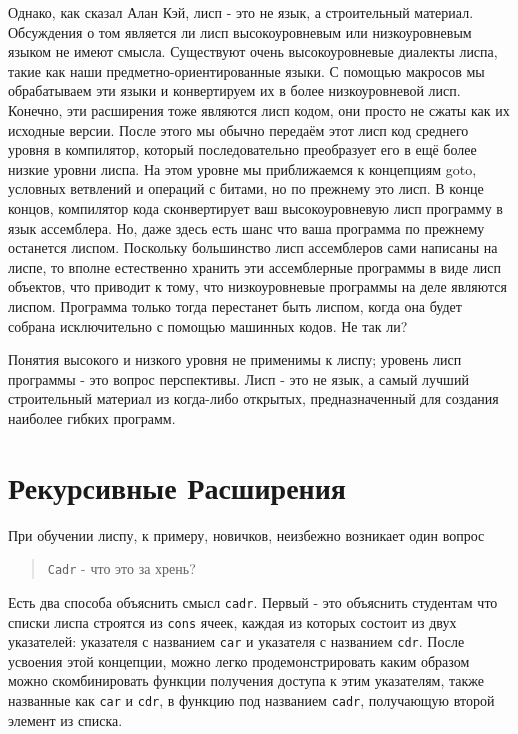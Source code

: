 Однако, как сказал Алан Кэй, лисп - это не язык, а строительный материал. Обсуждения о том является ли лисп высокоуровневым или низкоуровневым языком не имеют смысла. Существуют очень высокоуровневые диалекты лиспа, такие как наши предметно-ориентированные языки. С помощью макросов мы обрабатываем эти языки и конвертируем их в более низкоуровневой лисп. Конечно, эти расширения тоже являются лисп кодом, они просто не сжаты как их исходные версии. После этого мы обычно передаём этот лисп код среднего уровня в компилятор, который последовательно преобразует его в ещё более низкие уровни лиспа. На этом уровне мы приближаемся к концепциям goto, условных ветвлений и операций с битами, но по прежнему это лисп. В конце концов, компилятор кода сконвертирует ваш высокоуровневую лисп программу в язык ассемблера. Но, даже здесь есть шанс что ваша программа по прежнему останется лиспом. Поскольку большинство лисп ассемблеров сами написаны на лиспе, то вполне естественно хранить эти ассемблерные программы в виде лисп объектов, что приводит к тому, что низкоуровневые программы на деле являются лиспом. Программа только тогда перестанет быть лиспом, когда она будет собрана исключительно с помощью машинных кодов. Не так ли?

Понятия высокого и низкого уровня не применимы к лиспу; уровень лисп программы - это вопрос перспективы. Лисп - это не язык, а самый лучший строительный материал из когда-либо открытых, предназначенный для создания наиболее гибких программ.

\section{Рекурсивные Расширения}\label{section_recursive_expansions}

При обучении лиспу, к примеру, новичков, неизбежно возникает один вопрос

\begin{quote}
\verb"Cadr" - что это за хрень?
\end{quote}

Есть два способа объяснить смысл \verb"cadr". Первый - это объяснить студентам что списки лиспа строятся из \verb"cons" ячеек, каждая из которых состоит из двух указателей: указателя с названием \verb"car" и указателя с названием \verb"cdr". После усвоения этой концепции, можно легко продемонстрировать каким образом можно скомбинировать функции получения доступа к этим указателям, также названные как \verb"car" и \verb"cdr", в функцию под названием \verb"cadr", получающую второй элемент из списка.

